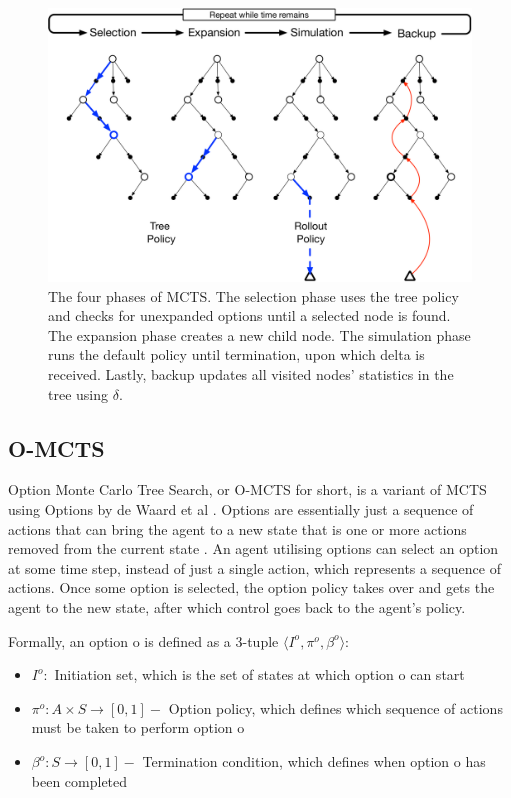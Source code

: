 \documentclass[12pt,a4paper]{article}
\begin{document}
\begin{multicols}{2}
\begin{figure}[H]
    \centering
    \includegraphics[width=\linewidth]{MCTS-phases.png}
    \caption{The four phases of MCTS. The selection phase uses the tree policy and checks for unexpanded options until a selected node is found. The expansion phase creates a new child node. The simulation phase runs the default policy until termination, upon which delta is received. Lastly, backup updates all visited nodes' statistics in the tree using $\delta$. \cite{sutton1998reinforcement}}
    \label{fig:mcts-phases}
\end{figure}

\subsection{O-MCTS}
Option Monte Carlo Tree Search, or O-MCTS for short, is a variant of MCTS using Options by de Waard et al \cite{de2016monte}.  Options are essentially just a sequence of actions that can bring the agent to a new state that is one or more actions removed from the current state \cite{sutton1999between}.  An agent utilising options can select an option at some time step, instead of just a single action, which represents a sequence of actions. Once some option is selected, the option policy takes over and gets the agent to the new state, after which control goes back to the agent's policy.

Formally, an option o is defined as a 3-tuple $\big \langle I^o, \pi^o, \beta^o \big \rangle$:
\begin{itemize}
    \item $I^o: $ Initiation set, which is the set of states at which option o can start
    \item $\pi^o: A \times S \rightarrow \left[0,1 \right] - $ Option policy, which defines which sequence of actions must be taken to perform option o
    \item $\beta^o: S \rightarrow \left[0, 1\right] - $ Termination condition, which defines when option o has been completed
\end{itemize}


\end{multicols}
\end{document}
